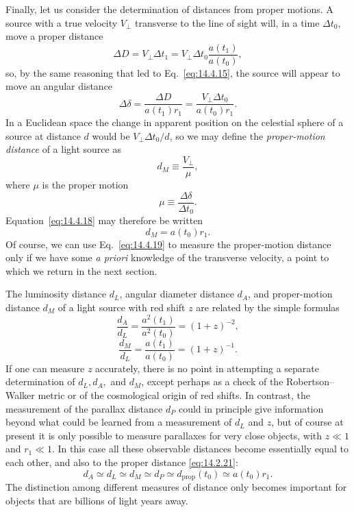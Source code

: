Finally, let us consider the determination of distances from proper motions.
A source with a true velocity \(V_\perp\) transverse to the line of sight
will, in a time \(\Delta t_0\), move a proper distance
\[
  \Delta D
  =
  V_\perp\Delta t_1
  =
  V_\perp\Delta t_0\frac{a(t_1)}{a(t_0)},
\]
so, by the same reasoning that led to Eq.~\eqref{eq:14.4.15}, the source
will appear to move an angular distance
\begin{equation}
  \Delta\delta
  =
  \frac{\Delta D}{a(t_1)r_1}
  =
  \frac{V_\perp\Delta t_0}{a(t_0)r_1}.
  \tag{14.4.18}\label{eq:14.4.18}
\end{equation}
In a Euclidean space the change in apparent position on the celestial sphere
of a source at distance \(d\) would be \(V_\perp\Delta t_0/d\), so we may
define the \emph{proper-motion distance} of a light source as
\begin{equation}
  d_M\equiv\frac{V_\perp}{\mu},
  \tag{14.4.19}\label{eq:14.4.19}
\end{equation}
where \(\mu\) is the proper motion
\begin{equation}
  \mu\equiv\frac{\Delta\delta}{\Delta t_0}.
  \tag{14.4.20}\label{eq:14.4.20}
\end{equation}
Equation~\eqref{eq:14.4.18} may therefore be written
\begin{equation}
  d_M=a(t_0)r_1.
  \tag{14.4.21}\label{eq:14.4.21}
\end{equation}
Of course, we can use Eq.~\eqref{eq:14.4.19} to measure the proper-motion
distance only if we have some \emph{a priori} knowledge of the transverse
velocity, a point to which we return in the next section.

The luminosity distance \(d_L\), angular diameter distance \(d_A\), and
proper-motion distance \(d_M\) of a light source with red shift \(z\) are
related by the simple formulas
\begin{equation}
  \frac{d_A}{d_L}
  =
  \frac{a^2(t_1)}{a^2(t_0)}
  =
  (1+z)^{-2},
  \tag{14.4.22}\label{eq:14.4.22}
\end{equation}
\begin{equation}
  \frac{d_M}{d_L}
  =
  \frac{a(t_1)}{a(t_0)}
  =
  (1+z)^{-1}.
  \tag{14.4.23}\label{eq:14.4.23}
\end{equation}
If one can measure \(z\) accurately, there is no point in attempting a
separate determination of \(d_L,d_A,\) and \(d_M\), except perhaps as a
check of the Robertson--Walker metric or of the cosmological origin of red
shifts. In contrast, the measurement of the parallax distance \(d_P\) could
in principle give information beyond what could be learned from a
measurement of \(d_L\) and \(z\), but of course at present it is only
possible to measure parallaxes for very close objects, with \(z\ll1\) and
\(r_1\ll1\). In this case all these observable distances become essentially
equal to each other, and also to the proper distance \eqref{eq:14.2.21}:
\begin{equation}
  d_A
  \simeq d_L
  \simeq d_M
  \simeq d_P
  \simeq d_{\mathrm{prop}}(t_0)
  \simeq a(t_0)r_1.
  \tag{14.4.24}\label{eq:14.4.24}
\end{equation}
The distinction among different measures of distance only becomes important
for objects that are billions of light years away.

